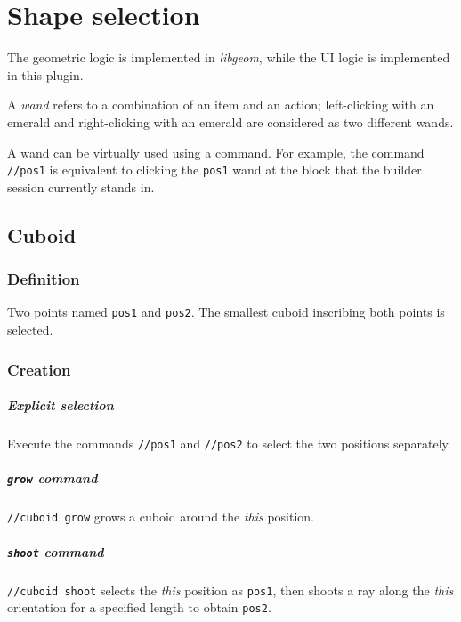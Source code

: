 \documentclass{article}
\begin{document}
		\chapter{Shape selection}
			The geometric logic is implemented in \textit{libgeom}, while the UI logic is implemented in this plugin.

			A \emph{wand} refers to a combination of an item and an action; left-clicking with an emerald and
			right-clicking with an emerald are considered as two different wands.

			A wand can be virtually used using a command. For example, the command \texttt{//pos1} is equivalent to clicking
			the \texttt{pos1} wand at the block that the builder session currently stands in.

			\section{Cuboid}
				\subsection{Definition} Two points named \texttt{pos1} and \texttt{pos2}. The smallest cuboid
				inscribing both points is selected.
				\subsection{Creation}
					\paragraph{Explicit selection} Execute the commands \texttt{//pos1} and \texttt{//pos2} to select the two
					positions separately.
					\paragraph{\texttt{grow} command} \texttt{//cuboid grow} grows a cuboid around the \textit{this}
					position.
					\paragraph{\texttt{shoot} command} \texttt{//cuboid shoot} selects the \textit{this} position as
					\texttt{pos1}, then shoots a ray along the \textit{this} orientation for a specified length to
					obtain \texttt{pos2}.
\end{document}
